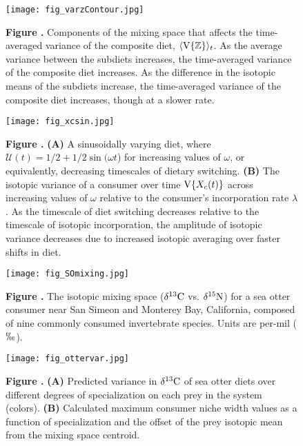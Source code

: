 \documentclass{frontiersSCNS}
\begin{document}
\begin{figure}[h!]
\begin{center}
\texttt{[image: fig\_varzContour.jpg]}
\end{center}
\textbf{\label{figvarcont} Figure .}{
Components of the mixing space that affects the time-averaged variance of the composite diet, $\langle {\rm V}\{\mathbb{Z}\} \rangle_t$.
As the average variance between the subdiets increases, the time-averaged variance of the composite diet increases.
As the difference in the isotopic means of the subdiets increase, the time-averaged variance of the composite diet increases, though at a slower rate.
}
\end{figure}


\begin{figure}[h!]
\begin{center}
\texttt{[image: fig\_xcsin.jpg]}
\end{center}
\textbf{\label{figxcsin} Figure .}{
{\bf(A)} A sinusoidally varying diet, where $\mathcal{U}(t) = 1/2 + 1/2\sin(\omega t$) for increasing values of $\omega$, or equivalently, decreasing timescales of dietary switching.
{\bf(B)} The isotopic variance of a consumer over time ${\rm V}\{X_c(t)\}$ across increasing values of $\omega$ relative to the consumer's incorporation rate $\lambda$. 
As the timescale of diet switching decreases relative to the timescale of isotopic incorporation, the amplitude of isotopic variance decreases due to increased isotopic averaging over faster shifts in diet.
}
\end{figure}

\begin{figure}[h!]
\begin{center}
\texttt{[image: fig\_SOmixing.jpg]}
\end{center}
\textbf{\label{figsomix} Figure .}{
The isotopic mixing space ($\delta^{13}{\rm C}$ vs. $\delta^{15}{\rm N}$) for a sea otter consumer near San Simeon and Monterey Bay, California, composed of nine commonly consumed invertebrate species. Units are per-mil ($\permil$).
}
\end{figure}


\begin{figure}[h!]
\begin{center}
\texttt{[image: fig\_ottervar.jpg]}
\end{center}
\textbf{\label{figottervar} Figure .}{
{\bf(A)} Predicted variance in $\delta^{13}{\rm C}$ of sea otter diets over different degrees of specialization on each prey in the system (colors).
{\bf(B)} Calculated maximum consumer niche width values as a function of specialization and the offset of the prey isotopic mean from the mixing space centroid.
}
\end{figure}
\end{document}
